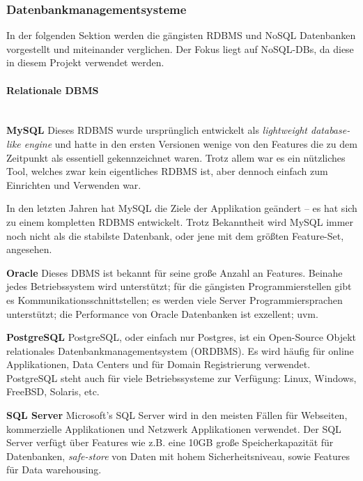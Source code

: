 \subsubsection{Datenbankmanagementsysteme}
\label{subsec:dbms}

In der folgenden Sektion werden die gängisten RDBMS und NoSQL Datenbanken vorgestellt und miteinander verglichen. Der Fokus liegt auf NoSQL-DBs, da diese in diesem Projekt verwendet werden.

\paragraph{Relationale DBMS}\mbox{}\\
\textbf{MySQL\newline}
Dieses RDBMS wurde ursprünglich entwickelt als \textit{lightweight database-like engine} und hatte in den ersten Versionen wenige von den Features die zu dem Zeitpunkt als essentiell gekennzeichnet waren. Trotz allem war es ein nützliches Tool, welches zwar kein eigentliches RDBMS ist, aber dennoch einfach zum Einrichten und Verwenden war.

In den letzten Jahren hat MySQL die Ziele der Applikation geändert – es hat sich zu einem kompletten RDBMS entwickelt.  Trotz Bekanntheit wird MySQL immer noch nicht als die stabilste Datenbank, oder jene mit dem größten Feature-Set, angesehen.

\textbf{Oracle\newline}
Dieses DBMS ist bekannt für seine große Anzahl an Features. Beinahe jedes Betriebssystem wird unterstützt; für die gängisten Programmierstellen gibt es Kommunikationsschnittstellen; es werden viele Server Programmiersprachen unterstützt; die Performance von Oracle Datenbanken ist exzellent; uvm.

\textbf{PostgreSQL\newline}
PostgreSQL, oder einfach nur Postgres, ist ein Open-Source Objekt relationales Datenbankmanagementsystem (ORDBMS). Es wird häufig für online Applikationen, Data Centers und für Domain Registrierung verwendet. PostgreSQL steht auch für viele Betriebssysteme zur Verfügung: Linux, Windows, FreeBSD, Solaris, etc.

\textbf{SQL Server\newline}
Microsoft's SQL Server wird in den meisten Fällen für Webseiten, kommerzielle Applikationen und Netzwerk Applikationen verwendet. Der SQL Server verfügt über Features wie z.B. eine 10GB große Speicherkapazität für Datenbanken, \textit{safe-store} von Daten mit hohem Sicherheitsniveau, sowie Features für Data warehousing.\nextline 

